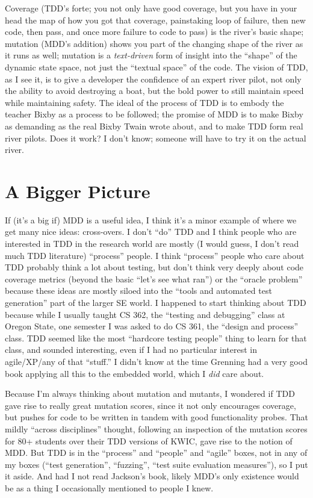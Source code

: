 \documentclass[sigplan,screen]{acmart}
\begin{document}
Coverage (TDD's forte; you not only have good coverage, but you have
in your head the map of how you got that coverage, painstaking loop of
failure, then new code, then pass, and once more failure to code to pass) is the river's basic
shape; mutation (MDD's addition) shows you part of the changing shape
of the river as it runs as well; mutation is a \emph{text-driven} form
of insight into the ``shape'' of the dynamic state space, not just the
``textual space'' of the code.  The vision of TDD, as I see it, is to
give a developer the confidence of an expert river pilot, not only the
ability to avoid destroying a boat, but the bold power to still
maintain speed while maintaining safety.  The ideal of the process of
TDD is to embody the teacher Bixby as a process to be followed; the
promise of MDD is to make Bixby as demanding as the real Bixby Twain
wrote about, and to make TDD form real river pilots.  Does it work?  I
don't know; someone will have to try it on the actual river.

\section{A Bigger Picture}

If (it's a big if) MDD is a useful idea, I think it's a minor example
of where we get many nice ideas:  cross-overs.  I don't ``do'' TDD and
I think people who are interested in TDD in the research world are
mostly (I would guess, I don't read much TDD literature) ``process''
people.  I think ``process'' people who care about TDD probably think
a lot about testing, but don't think very deeply about code coverage
metrics (beyond the basic ``let's see what ran'') or the ``oracle
problem''~\cite{staats2011programs,oracleMcMinn} because these ideas are mostly siloed into the ``tools and
automated test generation'' part of the larger SE world.  I happened
to start thinking about TDD because while I usually taught CS 362, the
``testing and debugging'' class at Oregon State, one semester I was
asked to do CS 361, the ``design and process'' class.  TDD seemed like
the most ``hardcore testing people'' thing to learn for that class,
and sounded interesting, even if I had no particular interest in
agile/XP/any of that ``stuff.''  I didn't know at the time Grenning
had a very good book applying all this to the embedded world, which I
\emph{did} care about.

Because I'm always thinking about mutation and mutants, I wondered if
TDD gave rise to really great mutation scores, since it not only
encourages coverage, but pushes for code to be written in tandem with
good functionality probes.  That mildly ``across disciplines''
thought, following an inspection of the mutation scores for 80+
students over their TDD versions of KWIC,
gave rise to the notion of MDD.  But TDD is in the ``process'' and
``people'' and ``agile'' boxes, not in any of my boxes (``test
generation'', ``fuzzing'', ``test suite evaluation measures''), so I
put it aside.  And had I not read Jackson's book, likely MDD's only
existence would be as a thing I occasionally mentioned to people I knew.
\end{document}
